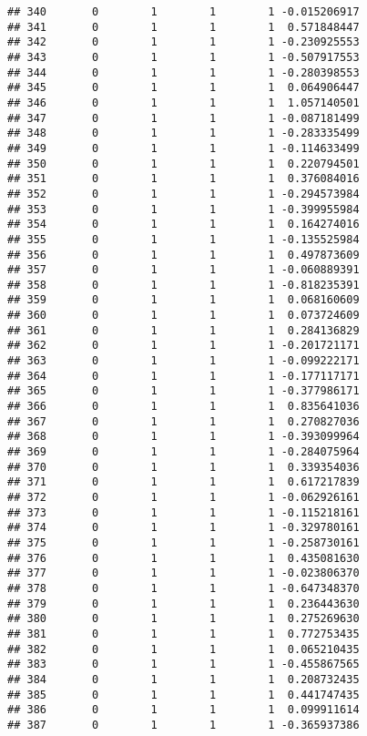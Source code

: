 \documentclass[]{book}
\theoremstyle{definition}
\theoremstyle{definition}
\theoremstyle{definition}
\theoremstyle{remark}
\begin{document}
\begin{verbatim}
## 340       0        1        1        1 -0.015206917
## 341       0        1        1        1  0.571848447
## 342       0        1        1        1 -0.230925553
## 343       0        1        1        1 -0.507917553
## 344       0        1        1        1 -0.280398553
## 345       0        1        1        1  0.064906447
## 346       0        1        1        1  1.057140501
## 347       0        1        1        1 -0.087181499
## 348       0        1        1        1 -0.283335499
## 349       0        1        1        1 -0.114633499
## 350       0        1        1        1  0.220794501
## 351       0        1        1        1  0.376084016
## 352       0        1        1        1 -0.294573984
## 353       0        1        1        1 -0.399955984
## 354       0        1        1        1  0.164274016
## 355       0        1        1        1 -0.135525984
## 356       0        1        1        1  0.497873609
## 357       0        1        1        1 -0.060889391
## 358       0        1        1        1 -0.818235391
## 359       0        1        1        1  0.068160609
## 360       0        1        1        1  0.073724609
## 361       0        1        1        1  0.284136829
## 362       0        1        1        1 -0.201721171
## 363       0        1        1        1 -0.099222171
## 364       0        1        1        1 -0.177117171
## 365       0        1        1        1 -0.377986171
## 366       0        1        1        1  0.835641036
## 367       0        1        1        1  0.270827036
## 368       0        1        1        1 -0.393099964
## 369       0        1        1        1 -0.284075964
## 370       0        1        1        1  0.339354036
## 371       0        1        1        1  0.617217839
## 372       0        1        1        1 -0.062926161
## 373       0        1        1        1 -0.115218161
## 374       0        1        1        1 -0.329780161
## 375       0        1        1        1 -0.258730161
## 376       0        1        1        1  0.435081630
## 377       0        1        1        1 -0.023806370
## 378       0        1        1        1 -0.647348370
## 379       0        1        1        1  0.236443630
## 380       0        1        1        1  0.275269630
## 381       0        1        1        1  0.772753435
## 382       0        1        1        1  0.065210435
## 383       0        1        1        1 -0.455867565
## 384       0        1        1        1  0.208732435
## 385       0        1        1        1  0.441747435
## 386       0        1        1        1  0.099911614
## 387       0        1        1        1 -0.365937386

\end{verbatim}
\end{document}

